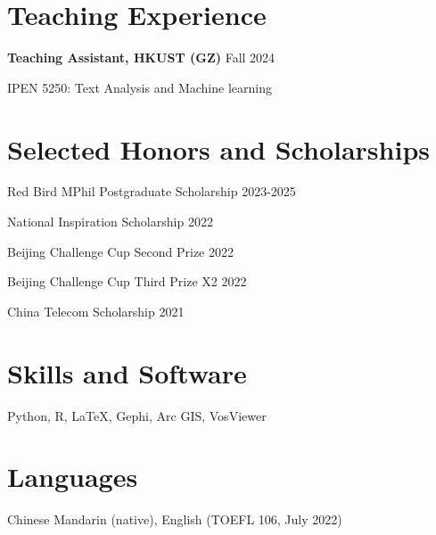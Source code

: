 \documentclass[letterpaper, 11pt]{article}
\begin{document}
\section{Teaching Experience}
\textbf{Teaching Assistant, HKUST (GZ)} \hfill Fall 2024

IPEN 5250: Text Analysis and Machine learning

\section{Selected Honors and Scholarships}
Red Bird MPhil Postgraduate Scholarship \hfill 2023-2025

National Inspiration Scholarship \hfill 2022

Beijing Challenge Cup Second Prize \hfill 2022

Beijing Challenge Cup Third Prize X2 \hfill 2022

China Telecom Scholarship \hfill 2021

\section{Skills and Software}
Python, R, LaTeX, Gephi, Arc GIS, VosViewer

\section{Languages}
Chinese Mandarin (native), English (TOEFL 106, July 2022)
\end{document}

